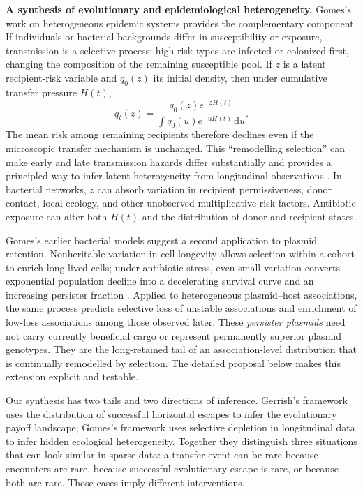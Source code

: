 \documentclass[12pt,a4paper]{article}
\newcommand{\dd}{\,\mathrm{d}}
\begin{document}
\textbf{A synthesis of evolutionary and epidemiological heterogeneity.} Gomes's work on heterogeneous epidemic systems provides the complementary component. If individuals or bacterial backgrounds differ in susceptibility or exposure, transmission is a selective process: high-risk types are infected or colonized first, changing the composition of the remaining susceptible pool. If $z$ is a latent recipient-risk variable and $q_0(z)$ its initial density, then under cumulative transfer pressure $H(t)$,
\begin{equation}
q_t(z)=\frac{q_0(z)e^{-zH(t)}}{\int q_0(u)e^{-uH(t)}\dd u}.
\label{eq:selection}
\end{equation}
The mean risk among remaining recipients therefore declines even if the microscopic transfer mechanism is unchanged. This ``remodelling selection'' can make early and late transmission hazards differ substantially and provides a principled way to infer latent heterogeneity from longitudinal observations \citep{gomes2004,gomes2022,gomes2024,elie2022}. In bacterial networks, $z$ can absorb variation in recipient permissiveness, donor contact, local ecology, and other unobserved multiplicative risk factors. Antibiotic exposure can alter both $H(t)$ and the distribution of donor and recipient states.

Gomes's earlier bacterial models suggest a second application to plasmid retention. Nonheritable variation in cell longevity allows selection within a cohort to enrich long-lived cells; under antibiotic stress, even small variation converts exponential population decline into a decelerating survival curve and an increasing persister fraction \citep{gomes2019variation}. Applied to heterogeneous plasmid--host associations, the same process predicts selective loss of unstable associations and enrichment of low-loss associations among those observed later. These \emph{persister plasmids} need not carry currently beneficial cargo or represent permanently superior plasmid genotypes. They are the long-retained tail of an association-level distribution that is continually remodelled by selection. The detailed proposal below makes this extension explicit and testable.

Our synthesis has two tails and two directions of inference. Gerrish's framework uses the distribution of successful horizontal escapes to infer the evolutionary payoff landscape; Gomes's framework uses selective depletion in longitudinal data to infer hidden ecological heterogeneity. Together they distinguish three situations that can look similar in sparse data: a transfer event can be rare because encounters are rare, because successful evolutionary escape is rare, or because both are rare. Those cases imply different interventions.
\end{document}
